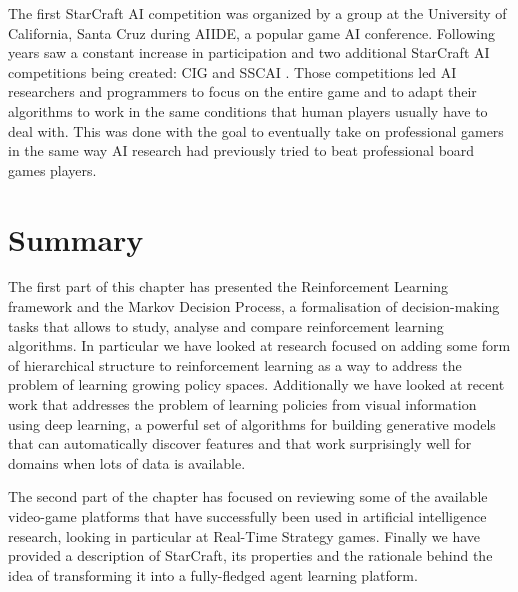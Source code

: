 The first StarCraft AI competition was organized by a group at the University of
California, Santa Cruz during AIIDE, a popular game AI conference. Following
years saw a constant increase in participation and two additional StarCraft AI
competitions being created: CIG and SSCAI \citep{buro2012real}. Those
competitions led AI researchers and programmers to focus on the entire game and
to adapt their algorithms to work in the same conditions that human players
usually have to deal with. This was done with the goal to eventually take on
professional gamers in the same way AI research had previously tried to beat
professional board games players.

\section{Summary}

The first part of this chapter has presented the Reinforcement Learning
framework and the Markov Decision Process, a formalisation of decision-making
tasks that allows to study, analyse and compare reinforcement learning
algorithms. In particular we have looked at research focused on adding some form
of hierarchical structure to reinforcement learning as a way to address the
problem of learning growing policy spaces. Additionally we have looked at recent
work that addresses the problem of learning policies from visual information
using deep learning, a powerful set of algorithms for building generative models
that can automatically discover features and that work surprisingly well for
domains when lots of data is available.

The second part of the chapter has focused on reviewing some of the available
video-game platforms that have successfully been used in artificial intelligence
research, looking in particular at Real-Time Strategy games. Finally we have
provided a description of StarCraft, its properties and the rationale behind the
idea of transforming it into a fully-fledged agent learning platform.